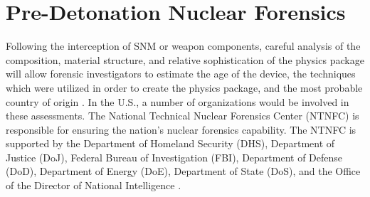 \documentclass{report}
\begin{document}
% 
% 
% 
% 


\section{Pre-Detonation Nuclear Forensics}

Following the interception of SNM or weapon components, careful analysis of the composition, material structure, and relative sophistication of the physics package will allow forensic investigators to estimate the age of the device, the techniques which were utilized in order to create the physics package, and the most probable country of origin \cite{Glaser2008}. In the U.S., a number of organizations would be involved in these assessments. The National Technical Nuclear Forensics Center (NTNFC) is responsible for ensuring the nation's nuclear forensics capability.  The NTNFC is supported by the Department of Homeland Security (DHS), Department of Justice (DoJ), Federal Bureau of Investigation (FBI), Department of Defense (DoD), Department of Energy (DoE), Department of State (DoS), and the Office of the Director of National Intelligence  \cite{DepartmentOfHomelandSecurit}. 
\end{document}
